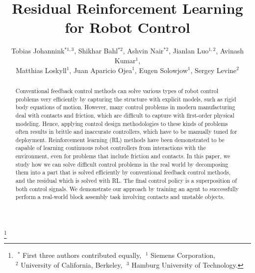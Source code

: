 \documentclass[letterpaper, 10 pt, conference]{ieeeconf}  %
\title{\LARGE \bf
Residual Reinforcement Learning for Robot Control
}
\author{Tobias Johannink$^{*1,3}$, Shikhar Bahl$^{*2}$, Ashvin Nair$^{*2}$, Jianlan Luo$^{1,2}$, Avinash Kumar$^{1}$,\\ Matthias Loskyll$^{1}$, Juan Aparicio Ojea$^{1}$, Eugen Solowjow$^{1}$, Sergey Levine$^2$}
\newcommand\blfootnote[1]{%
  \begingroup
  \renewcommand\thefootnote{}\footnote{#1}%
  \addtocounter{footnote}{-1}%
  \endgroup
}
\begin{document}
\maketitle
\blfootnote{$\;^*$ First three authors contributed equally, $\;^1$ Siemens Corporation, \\ $^2$ University of California, Berkeley, $\;^3$ Hamburg University of Technology.}

\thispagestyle{empty}
\pagestyle{empty}


\vspace{-10pt}

\begin{abstract}
Conventional feedback control methods can solve various types of robot control problems 
very efficiently by capturing the structure with explicit models, such as rigid body equations of motion.
However, many control problems in modern manufacturing deal with contacts and friction, which are difficult to capture with first-order physical modeling. 
Hence, applying control design methodologies to these kinds of problems often results in brittle and inaccurate controllers, which have to be manually tuned for deployment.
Reinforcement learning (RL) methods have been demonstrated to be capable of learning continuous robot controllers from interactions with the environment, even for problems that include friction and contacts.
In this paper, we study how we can solve difficult control problems in the real world by decomposing them into a part that is solved efficiently by conventional feedback control methods, and the residual which is solved with RL. 
The final control policy is a superposition of both control signals.
We demonstrate our approach by training an agent to successfully perform a real-world block assembly task involving contacts and unstable objects.
\end{abstract}











{\small


}
\end{document}
